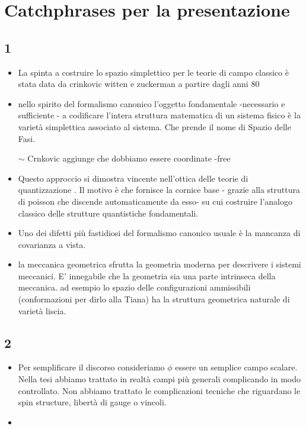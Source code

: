 \documentclass[Cascione]{subfiles}
\begin{document}
\chapter{Catchphrases per la presentazione}
	\section{1}
	\begin{itemize}
		\item La spinta a costruire lo spazio simplettico per le teorie di campo classico è stata data da crinkovic witten e zuckerman a partire dagli anni 80
		\item nello spirito del formalismo canonico l'oggetto fondamentale  -necessario e sufficiente - a codificare l'intera struttura matematica di un sistema fisico è la varietà simplettica associato al sistema. Che prende il nome di Spazio delle Fasi.
		\item[$\sim$]Crnkovic aggiunge che dobbiamo essere coordinate -free 
		\item Questo approccio si dimostra vincente nell'ottica delle teorie di quantizzazione . Il motivo è che fornisce la cornice base - grazie alla struttura di poisson che discende automaticamente da esso- su cui costruire l'analogo classico delle strutture quantistiche fondamentali.
		\item Uno dei difetti più fastidiosi del formalismo canonico usuale è la mancanza di covarianza a vista.
		\item la meccanica geometrica sfrutta la geometria moderna per descrivere i sistemi meccanici. E' innegabile che la geometria sia una parte intrinseca della meccanica. ad esempio lo spazio delle configurazioni ammissibili (conformazioni per dirlo alla Tiana) ha la struttura geometrica naturale di varietà liscia.
	\end{itemize}		
	
	
	
	\section{2}
	\begin{itemize}
		\item Per semplificare il discorso consideriamo $\phi$ essere un semplice campo scalare. Nella tesi abbiamo trattato in realtà campi più generali complicando in modo controllato. Non abbiamo trattato le complicazioni tecniche che riguardano le spin structure, libertà di gauge o vincoli.
		\item
	\end{itemize}
\end{document}
